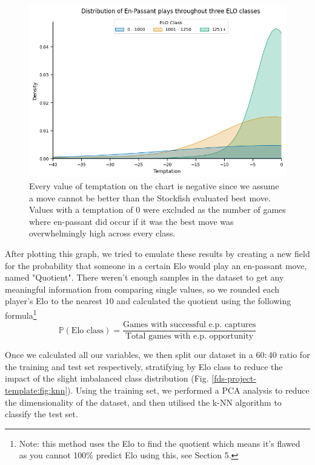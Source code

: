 \documentclass[10pt,a4paper]{article}
\begin{document}
\begin{multicols}{2}
\begin{figure}[t]
  \centering
  \includegraphics[width=\textwidth]{report/images/ep_distplot.png}
  \caption{Every value of temptation on the chart is negative since we assume a move cannot be better than the Stockfish evaluated best move. Values with a temptation of $0$ were excluded as the number of games where en-passant did occur if it was the best move was overwhelmingly high across every class.}
  \label{fds-project-template:fig:ep_distplot}
\end{figure}

After plotting this graph, we tried to emulate these results by creating a new field for the probability that someone in a certain Elo would play an en-passant move, named "Quotient". There weren't enough samples in the dataset to get any meaningful information from comparing single values, so we rounded each player's Elo to the nearest $10$ and calculated the quotient using the following formula\footnote[1]{Note: this method uses the Elo to find the quotient which means it's flawed as you cannot 100\% predict Elo using this, see Section 5.}
$$\mathbb{P}(\text{Elo class}) = \frac{\text{Games with successful e.p. captures}}{\text{Total games with e.p. opportunity}}$$

Once we calculated all our variables, we then split our dataset in a $60:40$ ratio for the training and test set respectively, stratifying by Elo class to reduce the impact of the slight imbalanced class distribution (Fig. \ref{fds-project-template:fig:knn}). Using the training set, we performed a PCA analysis to reduce the dimensionality of the dataset, and then utilised the k-NN algorithm to classify the test set.\newline


\end{multicols}
\end{document}
